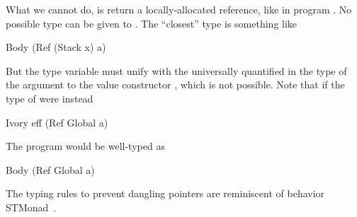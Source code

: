 What we cannot do, is return a locally-allocated reference, like in program
.  No possible type can be given to .  The ``closest'' type is
something like
\begin{code}
Body (Ref (Stack x) a)
\end{code}
\noindent
But the type variable  must unify with the universally quantified
 in the type of the argument to the value constructor , which is
not possible.  Note that if the type of  were instead
\begin{code}
Ivory eff (Ref Global a)
\end{code}
\noindent
The program  would be well-typed as
\begin{code}
Body (Ref Global a)
\end{code}
\noindent
The typing rules to prevent dangling pointers are reminiscent of behavior STMonad~\cite{stmonad}.








